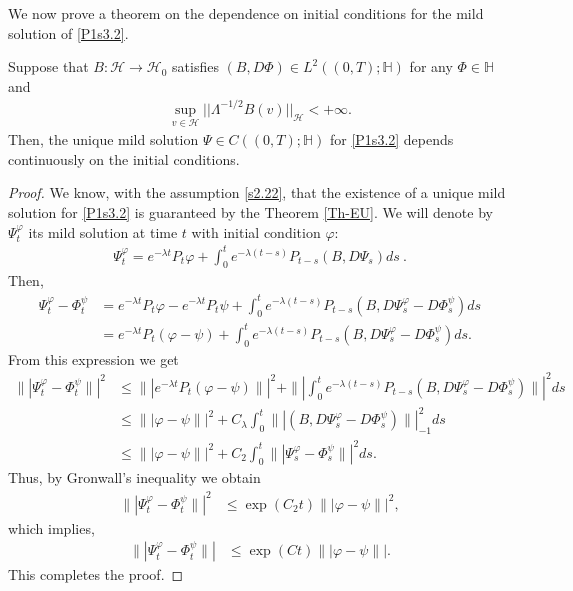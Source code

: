 \documentclass[review, onefignum, onetabnum]{siamart171218}
\begin{document}
 We now prove a theorem on the dependence on initial conditions for the mild
solution of \eqref{P1s3.2}.
 \begin{theorem}\label{Cont-Mild-Sol}
Suppose that $B:\mathcal{H}\rightarrow \mathcal{H}_0$ satisfies $(B,D\Phi)\in
L^2((0,T);\mathbb{H})$ for any $\Phi\in\mathbb{H}$ and
 \begin{align}\label{s2.22}
  \sup_{v\in \mathcal{H}} ||\Lambda^{-1/2}B(v)||_{\mathcal{H}}<+\infty.
 \end{align}
 Then, the unique mild solution $\Psi\in C((0,T); \mathbb{H})$ for
\eqref{P1s3.2} depends continuously on the initial conditions.

 \end{theorem}
\begin{proof}
We know, with the assumption \eqref{s2.22}, that the existence of a unique
mild solution for \eqref{P1s3.2} is guaranteed by the Theorem \ref{Th-EU}. We
will denote by $\Psi_t^\varphi$ its mild solution at time $t$ with initial
condition $\varphi$:
\begin{align*}
\Psi_t^\varphi=e^{-\lambda t} P_t  \varphi+  \int_0^t e^{-\lambda
(t-s)}P_{t-s}(B,D\Psi_s) ds \ .
\end{align*}
Then,
\begin{align*}
\Psi_t^\varphi-\Phi_t^\psi&=e^{-\lambda t} P_t \varphi -e^{-\lambda t} P_t
\psi+  \int_0^t e^{-\lambda (t-s)}P_{t-s}(B,D\Psi_s^\varphi-D\Phi_s^\psi) ds\\
&= e^{-\lambda t} P_t (\varphi - \psi)+  \int_0^t e^{-\lambda
(t-s)}P_{t-s}(B,D\Psi_s^\varphi-D\Phi_s^\psi) ds.
\end{align*}
From this expression we get
\begin{align*}
\| | \Psi_t^\varphi-\Phi_t^\psi\| |^2&\le \| |e^{-\lambda t} P_t (\varphi -
\psi)\| |^2+\| | \int_0^t e^{-\lambda
(t-s)}P_{t-s}(B,D\Psi_s^\varphi-D\Phi_s^\psi) \| |^2ds\\
&\le  \|  |\varphi - \psi\| |^2+ C_\lambda\int_0^t  \|
|(B,D\Psi_s^\varphi-D\Phi_s^\psi) \| |_{-1}^2 ds\\
&\le  \|  |\varphi - \psi\| |^2+ C_2\int_0^t  \| |\Psi_s^\varphi-\Phi_s^\psi
\| |^2 ds.
\end{align*}
Thus, by Gronwall's inequality we obtain
\begin{align}\label{s2.23}
    \| |
         \Psi_t^\varphi-\Phi_t^\psi\| |^2&\le \exp(C_2t)  \|  | \varphi - 
         \psi
    \| |^2, 
\end{align}
which implies,
\begin{align*}
\| | \Psi_t^\varphi-\Phi_t^\psi\| |&\le \exp(Ct)  \| | \varphi - \psi\| |.
\end{align*}
This completes the proof.
\end{proof}
\end{document}
